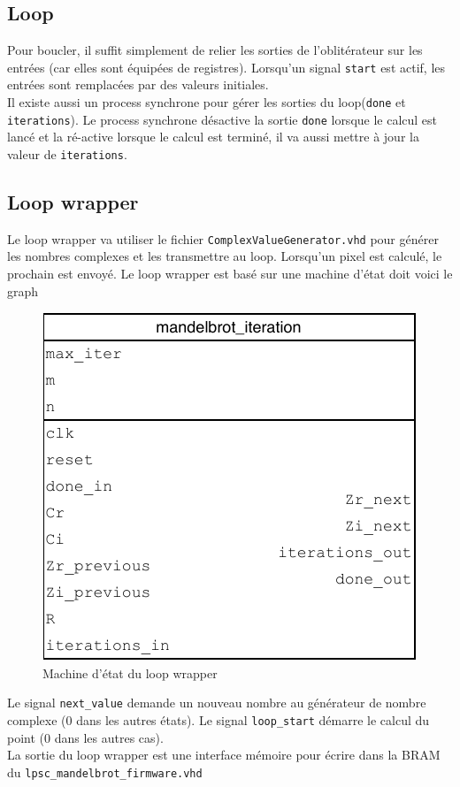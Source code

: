 \documentclass[LPSC_Labo03_SDeriaz]{subfiles}
\begin{document}
\subsection{Loop}
Pour boucler, il suffit simplement de relier les sorties de l'oblitérateur sur les entrées (car elles sont équipées de registres). Lorsqu'un signal \verb!start! est actif, les entrées sont remplacées par des valeurs initiales.\\
Il existe aussi un process synchrone pour gérer les sorties du loop(\verb!done! et \verb!iterations!). Le process synchrone désactive la sortie \verb!done! lorsque le calcul est lancé et la ré-active lorsque le calcul est terminé, il va aussi mettre à jour la valeur de \verb!iterations!.
\subsection{Loop wrapper}
Le loop wrapper va utiliser le fichier \verb!ComplexValueGenerator.vhd! pour générer les nombres complexes et les transmettre au loop. Lorsqu'un pixel est calculé, le prochain est envoyé. Le loop wrapper est basé sur une machine d'état doit voici le graph
\begin{figure}[H]
\centering
\includegraphics[scale=1,page=5]{../Documents/Schemas-crop.pdf}
\caption{Machine d'état du loop wrapper}
\end{figure}
Le signal \verb!next_value! demande un nouveau nombre au générateur de nombre complexe (0 dans les autres états). Le signal \verb!loop_start! démarre le calcul du point (0 dans les autres cas).\\
La sortie du loop wrapper est une interface mémoire pour écrire dans la BRAM du \verb!lpsc_mandelbrot_firmware.vhd!
\end{document}
